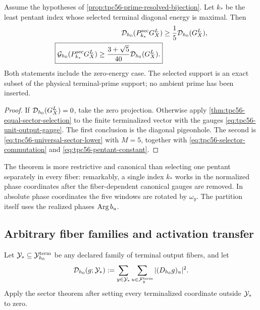 \begin{theorem}
\label{thm:tpc56-literal-pentant-extraction}
Assume the hypotheses of
\cref{prop:tpc56-prime-resolved-bijection}.  Let \(k_*\) be the least
pentant index whose selected terminal diagonal energy is maximal.  Then
\begin{align}
 \mathcal D_{h_0}(P_{k_*}^{\rm sec}G_X^L)
 &\ge\frac15\mathcal D_{h_0}(G_X^L),
 \label{eq:tpc56-selected-diagonal-fraction}\\
 \boxed{
 \mathcal G_{h_0}(P_{k_*}^{\rm sec}G_X^L)
 \ge\frac{3+\sqrt5}{40}\mathcal D_{h_0}(G_X^L).}
 \label{eq:tpc56-literal-pentant-lower}
\end{align}
Both statements include the zero-energy case.  The selected support is an
exact subset of the physical terminal-prime support; no ambient prime has
been inserted.
\end{theorem}

\begin{proof}
If \(\mathcal D_{h_0}(G_X^L)=0\), take the zero projection.  Otherwise apply
\cref{thm:tpc56-equal-sector-selection} to the finite terminalized vector
with the gauges \eqref{eq:tpc56-unit-output-gauge}.  The first conclusion
is the diagonal pigeonhole.  The second is
\eqref{eq:tpc56-universal-sector-lower} with \(M=5\), together with
\eqref{eq:tpc56-selector-commutation} and
\eqref{eq:tpc56-pentant-constant}.
\end{proof}

The theorem is more restrictive and canonical than selecting one pentant
separately in every fiber: remarkably, a single index \(k_*\) works in the
normalized phase coordinates after the fiber-dependent canonical gauges are
removed.  In absolute phase coordinates the five windows are rotated by
\(\omega_y\).  The partition itself uses the realized phases \(\operatorname{Arg} b_u\).

\subsection{Arbitrary fiber families and activation transfer}

Let \(\mathcal Y_*\subseteq\mathcal Y_{h_0}^{\rm term}\) be any declared family of
terminal output fibers, and let
\begin{equation}
 \mathcal D_{h_0}(g;\mathcal Y_*)
 :=\sum_{y\in\mathcal Y_*}\sum_{u\in\mathcal F_y^{\rm term}}
 |(D_{h_0}g)_u|^2.
 \label{eq:tpc56-fiber-family-diagonal}
\end{equation}
Apply the sector theorem after setting every terminalized coordinate
outside \(\mathcal Y_*\) to zero.

